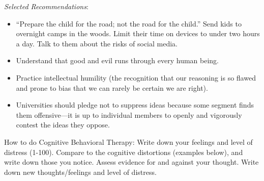 \documentclass[
]{article}
\begin{document}
\emph{Selected Recommendations}:

\begin{itemize}
\item
  ``Prepare the child for the road; not the road for the child.'' Send
  kids to overnight camps in the woods. Limit their time on devices to
  under two hours a day. Talk to them about the risks of social media.
\item
  Understand that good and evil runs through every human being.
\item
  Practice intellectual humility (the recognition that our reasoning is
  so flawed and prone to bias that we can rarely be certain we are
  right).
\item
  Universities should pledge not to suppress ideas because some segment
  finds them offensive---it is up to individual members to openly and
  vigorously contest the ideas they oppose.
\end{itemize}

How to do Cognitive Behavioral Therapy: Write down your feelings and
level of distress (1-100). Compare to the cognitive distortions
(examples below), and write down those you notice. Assess evidence for
and against your thought. Write down new thoughts/feelings and level of
distress.
\end{document}
